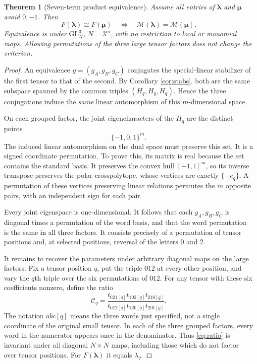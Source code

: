 \documentclass[11pt]{article}
\newtheorem{theorem}{Theorem}[section]
\theoremstyle{remark}\newtheorem{remark}[theorem]{Remark}
\newcommand{\GL}{\mathrm{GL}}
\newcommand{\mc}{\mathcal M}
\begin{document}
\begin{theorem}[Seven-term product equivalence]\label{thm:F}
Assume all entries of $\boldsymbol\lambda$ and $\boldsymbol\mu$ avoid $0,-1$. Then
\begin{equation}\label{eq:Fclass}
 F(\boldsymbol\lambda)\cong F(\boldsymbol\mu)
 \quad\Longleftrightarrow\quad
 \mc(\boldsymbol\lambda)=\mc(\boldsymbol\mu).
\end{equation}
Equivalence is under $\GL_N^3$, $N=3^m$, with no restriction to local or monomial maps. Allowing permutations of the three large tensor factors does not change the criterion.
\end{theorem}
\begin{proof}
An equivalence $g=(g_A,g_B,g_C)$ conjugates the special-linear stabilizer of the first tensor to that of the second. By Corollary \ref{cor:stabs}, both are the same subspace spanned by the common triples $(H_q,H_q,H_q)$. Hence the three conjugations induce the \emph{same} linear automorphism of this $m$-dimensional space.

On each grouped factor, the joint eigencharacters of the $H_q$ are the distinct points
\[
 \{-1,0,1\}^m.
\]
The induced linear automorphism on the dual space must preserve this set. It is a signed coordinate permutation. To prove this, its matrix is real because the set contains the standard basis. It preserves the convex hull $[-1,1]^m$, so its inverse transpose preserves the polar crosspolytope, whose vertices are exactly $\{\pm e_q\}$. A permutation of these vertices preserving linear relations permutes the $m$ opposite pairs, with an independent sign for each pair.

Every joint eigenspace is one-dimensional. It follows that each $g_A,g_B,g_C$ is diagonal times a permutation of the word basis, and that the word permutation is the same in all three factors. It consists precisely of a permutation of tensor positions and, at selected positions, reversal of the letters $0$ and $2$.

It remains to recover the parameters under arbitrary diagonal maps on the large factors. Fix a tensor position $q$, put the triple $012$ at every other position, and vary the $q$th triple over the six permutations of $012$. For any tensor with these six coefficients nonzero, define the ratio
\begin{equation}\label{eq:ratio}
 \mathcal C_q=
 \frac{t_{021[q]}t_{102[q]}t_{210[q]}}
      {t_{012[q]}t_{120[q]}t_{201[q]}}.
\end{equation}
The notation $abc[q]$ means the three words just specified, not a single coordinate of the original small tensor. In each of the three grouped factors, every word in the numerator appears once in the denominator. Thus \eqref{eq:ratio} is invariant under all diagonal $N\times N$ maps, including those which do not factor over tensor positions. For $F(\boldsymbol\lambda)$ it equals $\lambda_q$.


\end{proof}
\end{document}

